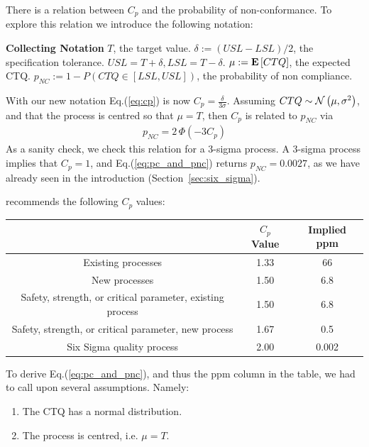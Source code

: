 \documentclass[12pt,a4paper]{report}
\theoremstyle{plain}
\theoremstyle{definition}
\newcommand{\targetValue}{T}\newcommand{\cp}{C_p}\newcommand{\cpHat}{\hat{C}_p}\newcommand{\ctqExpect}{\mu}
\newcommand{\pnc}{p_{NC}}
\begin{document}
There is a relation between $C_p$ and the probability of non-conformance. 
To explore this relation we introduce the following notation:
\begin{tcolorbox}
\footnotesize
\textbf{Collecting Notation} \newline
$\targetValue$, the target value. \newline
$\delta:= (USL-LSL)/2$, the specification tolerance. $USL=\targetValue+\delta, LSL=\targetValue-\delta$.  \newline
$\ctqExpect:= \expect{CTQ}$, the expected CTQ. \newline
$\pnc:= 1-P(CTQ \in [LSL,USL])$, the probability of non compliance. 
\end{tcolorbox}

With our new notation Eq.(\ref{eq:cp}) is now $\cp=\frac{\delta}{3 \sigma}$.
Assuming $CTQ \sim \mathcal{N}\left(\mu, \sigma^2\right)$, and that the process is centred so that $\ctqExpect=\targetValue$, then $\cp$ is related to $\pnc$ via
\begin{align}
\label{eq:pc_and_pnc}
	\pnc= 2\, \Phi(-3 \cp)
\end{align}
As a sanity check, we check this relation for a 3-sigma process.
A 3-sigma process implies that $\cp=1$, and Eq.(\ref{eq:pc_and_pnc}) returns $\pnc=0.0027$, as we have already seen in the introduction (Section~\ref{sec:six_sigma}).

\cite{montgomery_introduction_2007} recommends the following $\cp$ values:

\begin{tabular}{|c|c|c|}
\hline  & $\cp$ Value & Implied ppm \\ 
\hline \hline Existing processes
 & 1.33
 & 66 \\ 
\hline New processes
 & 1.50
 & 6.8 \\ 
\hline Safety, strength, or critical
parameter, existing process
 & 1.50
 & 6.8 \\ 
\hline Safety, strength, or critical
parameter, new process
 & 1.67
 & 0.5 \\ 
\hline Six Sigma quality process & 2.00 &  0.002 \\ 
\hline 
\end{tabular} 

\bigskip

To derive Eq.(\ref{eq:pc_and_pnc}), and thus the ppm column in the table, we had to call upon several assumptions.
Namely:
\begin{enumerate}
\item The CTQ has a normal distribution.
\item The process is centred, i.e. $\ctqExpect=\targetValue$.
\end{enumerate}
\end{document}
